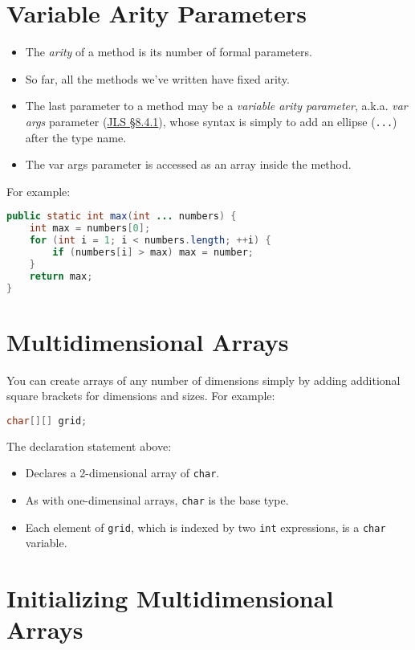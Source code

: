 \documentclass{article}
\begin{document}
\section{Variable Arity Parameters}


\begin{itemize}
\item The {\it arity} of a method is its number of formal parameters.
\item So far, all the methods we've written have fixed arity.
\item The last parameter to a method may be a {\it variable arity parameter}, a.k.a. {\it var args} parameter (\href{http://docs.oracle.com/javase/specs/jls/se8/html/jls-8.html#jls-8.4.1}{JLS \S 8.4.1}), whose syntax is simply to add an ellipse ({\tt ...}) after the type name.
\item The var args parameter is accessed as an array inside the method.
\end{itemize}
For example:
\begin{lstlisting}[language=Java]
public static int max(int ... numbers) {
    int max = numbers[0];
    for (int i = 1; i < numbers.length; ++i) {
        if (numbers[i] > max) max = number;
    }
    return max;
}
\end{lstlisting}


\section{Multidimensional Arrays}


You can create arrays of any number of dimensions simply by adding additional square brackets for dimensions and sizes.  For example:

\begin{lstlisting}[language=Java]
char[][] grid;
\end{lstlisting}
The declaration statement above:
\begin{itemize}
\item Declares a 2-dimensional array of  {\tt char}.
\item As with one-dimensinal arrays, {\tt char} is the base type.
\item Each element of {\tt grid}, which is indexed by two {\tt int} expressions, is a {\tt char} variable.
\end{itemize}



\section{Initializing Multidimensional Arrays}
\end{document}

